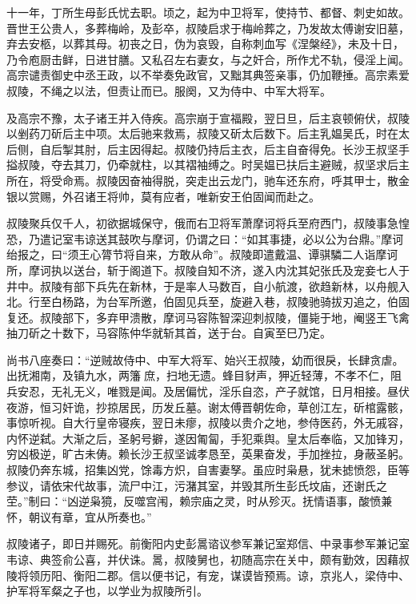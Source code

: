 \documentclass[]{article}
\begin{document}
十一年，丁所生母彭氏忧去职。顷之，起为中卫将军，使持节、都督、刺史如故。晋世王公贵人，多葬梅岭，及彭卒，叔陵启求于梅岭葬之，乃发故太傅谢安旧墓，弃去安柩，以葬其母。初丧之日，伪为哀毁，自称刺血写《涅槃经》，未及十日，乃令庖厨击鲜，日进甘膳。又私召左右妻女，与之奸合，所作尤不轨，侵淫上闻。高宗谴责御史中丞王政，以不举奏免政官，又黜其典签亲事，仍加鞭捶。高宗素爱叔陵，不绳之以法，但责让而已。服阕，又为侍中、中军大将军。

及高宗不豫，太子诸王并入侍疾。高宗崩于宣福殿，翌日旦，后主哀顿俯伏，叔陵以剉药刀斫后主中项。太后驰来救焉，叔陵又斫太后数下。后主乳媪吴氏，时在太后侧，自后掣其肘，后主因得起。叔陵仍持后主衣，后主自奋得免。长沙王叔坚手搤叔陵，夺去其刀，仍牵就柱，以其褶袖缚之。时吴媪已扶后主避贼，叔坚求后主所在，将受命焉。叔陵因奋袖得脱，突走出云龙门，驰车还东府，呼其甲士，散金银以赏赐，外召诸王将帅，莫有应者，唯新安王伯固闻而赴之。

叔陵聚兵仅千人，初欲据城保守，俄而右卫将军萧摩诃将兵至府西门，叔陵事急惶恐，乃遣记室韦谅送其鼓吹与摩诃，仍谓之曰：``如其事捷，必以公为台鼎。''摩诃绐报之，曰``须王心膂节将自来，方敢从命''。叔陵即遣戴温、谭骐驎二人诣摩诃所，摩诃执以送台，斩于阁道下。叔陵自知不济，遂入内沈其妃张氏及宠妾七人于井中。叔陵有部下兵先在新林，于是率人马数百，自小航渡，欲趋新林，以舟舰入北。行至白杨路，为台军所邀，伯固见兵至，旋避入巷，叔陵驰骑拔刃追之，伯固复还。叔陵部下，多弃甲溃散，摩诃马容陈智深迎刺叔陵，僵毙于地，阉竖王飞禽抽刀斫之十数下，马容陈仲华就斩其首，送于台。自寅至巳乃定。

尚书八座奏曰：``逆贼故侍中、中军大将军、始兴王叔陵，幼而很戾，长肆贪虐。出抚湘南，及镇九水，两籓庶，扫地无遗。蜂目豺声，狎近轻薄，不孝不仁，阻兵安忍，无礼无义，唯戮是闻。及居偏忧，淫乐自恣，产子就馆，日月相接。昼伏夜游，恒习奸诡，抄掠居民，历发丘墓。谢太傅晋朝佐命，草创江左，斫棺露骸，事惊听视。自大行皇帝寝疾，翌日未瘳，叔陵以贵介之地，参侍医药，外无戚容，内怀逆弑。大渐之后，圣躬号擗，遂因匍匐，手犯乘舆。皇太后奉临，又加锋刃，穷凶极逆，旷古未俦。赖长沙王叔坚诚孝恳至，英果奋发，手加挫拉，身蔽圣躬。叔陵仍奔东城，招集凶党，馀毒方炽，自害妻孥。虽应时枭悬，犹未摅愤怨，臣等参议，请依宋代故事，流尸中江，污潴其室，并毁其所生彭氏坟庙，还谢氏之茔。''制曰：``凶逆枭獍，反噬宫闱，赖宗庙之灵，时从殄灭。抚情语事，酸愤兼怀，朝议有章，宜从所奏也。''

叔陵诸子，即日并赐死。前衡阳内史彭暠谘议参军兼记室郑信、中录事参军兼记室韦谅、典签俞公喜，并伏诛。暠，叔陵舅也，初随高宗在关中，颇有勤效，因藉叔陵将领历阳、衡阳二郡。信以便书记，有宠，谋谟皆预焉。谅，京兆人，梁侍中、护军将军粲之子也，以学业为叔陵所引。
\end{document}

